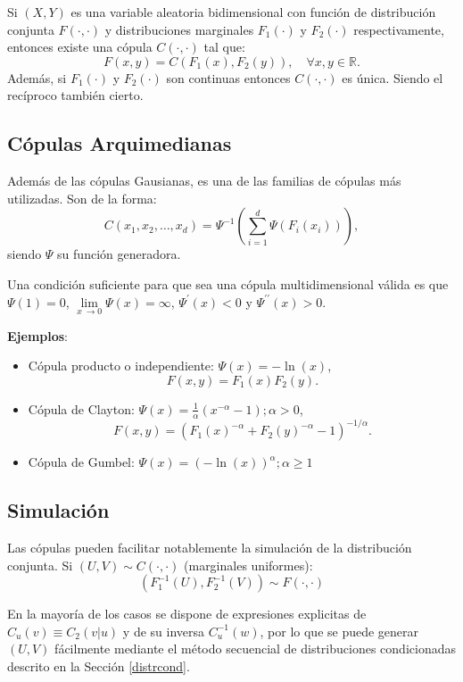 \documentclass[
]{book}
\theoremstyle{break}
\theoremstyle{definition}
\theoremstyle{definition}
\theoremstyle{definition}
\theoremstyle{remark}
\begin{document}
Si \((X,Y)\) es una variable aleatoria bidimensional con función de distribución conjunta \(F(\cdot,\cdot)\) y distribuciones marginales \(F_1(\cdot)\) y \(F_2(\cdot)\) respectivamente, entonces existe una cópula \(C(\cdot,\cdot)\) tal que:
\[F(x,y)=C\left( F_1(x),F_2(y)\right) ,\quad \forall x,y\in\mathbb{R}.\]
Además, si \(F_1(\cdot)\) y \(F_2(\cdot)\) son continuas entonces \(C(\cdot,\cdot)\) es única.
Siendo el recíproco también cierto.

\hypertarget{cuxf3pulas-arquimedianas}{%
\subsection{Cópulas Arquimedianas}\label{cuxf3pulas-arquimedianas}}

Además de las cópulas Gausianas, es una de las familias de cópulas más utilizadas.
Son de la forma:
\[C(x_1,x_2,\dots,x_d)
=\Psi^{-1}\left( \sum_{i=1}^d\Psi\left( F_i(x_i)\right)\right),\]
siendo \(\Psi\) su función generadora.

Una condición suficiente para que sea una cópula multidimensional válida es que \(\Psi(1)=0\), \(\lim \limits_{x\ \rightarrow0}\Psi(x)=\infty\), \(\Psi^{\prime}(x)<0\) y \(\Psi^{\prime \prime}(x)>0\).

\textbf{Ejemplos}:

\begin{itemize}
\item
  Cópula producto o independiente:
  \(\Psi(x)=-\ln(x)\),
  \[F(x,y)=F_1(x)F_2(y).\]
\item
  Cópula de Clayton: \(\Psi(x)=\frac{1}{\alpha}\left( x^{-\alpha }-1\right) ;\alpha>0\),
  \[F(x,y)=(F_1(x)^{-\alpha}+F_2(y)^{-\alpha}-1)^{-1/\alpha}.\]
\item
  Cópula de Gumbel:
  \(\Psi(x)=\left( -\ln(x)\right)^{\alpha};\alpha \geq1\)
\end{itemize}

\hypertarget{simulaciuxf3n}{%
\subsection{Simulación}\label{simulaciuxf3n}}

Las cópulas pueden facilitar notablemente la simulación de la distribución conjunta.
Si \((U,V)\sim C(\cdot,\cdot)\) (marginales uniformes):
\[\left( F_1^{-1}(U),F_2^{-1}(V)\right)  \sim F(\cdot,\cdot)\]

En la mayoría de los casos se dispone de expresiones explicitas de \(C_{u}(v)\equiv C_2\left( \left. v\right \vert u\right)\) y de su inversa \(C_{u}^{-1}(w)\), por lo que se puede generar \((U,V)\) fácilmente mediante el método secuencial de distribuciones condicionadas descrito en la Sección \ref{distrcond}.
\end{document}
